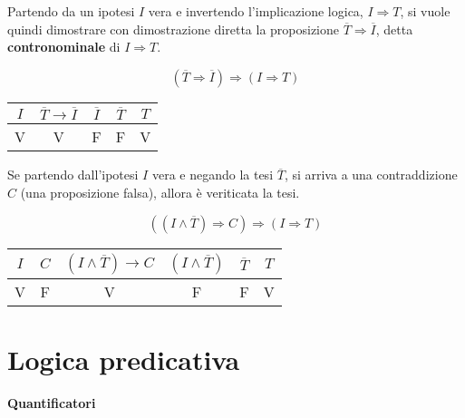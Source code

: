 \begin{definition} Partendo da un ipotesi $I$ vera e invertendo l'implicazione logica, $I \Rightarrow T$, si vuole quindi dimostrare con dimostrazione diretta la proposizione $\overline{T} \Rightarrow \overline{I}$, detta \textbf{contronominale} di $I \Rightarrow T$.
\end{definition}
\begin{equation}
    ( \overline{T} \Rightarrow \overline{I} ) \Rightarrow ( I \Rightarrow T )
\end{equation}
\begin{center}
\begin{tabular}{|c|c||c|c|c|}
  \hline
  $I$ & $\overline{T} \rightarrow \overline{I}$ & $\overline{I}$ & $\overline{T}$ & $T$ \\
  \hline
  V & V & F & F & V \\
  \hline
\end{tabular}
\end{center}

\begin{definition} Se partendo dall'ipotesi $I$ vera e negando la tesi $\overline{T}$, si arriva a una contraddizione $C$ (una proposizione falsa), allora è veriticata la tesi.
\end{definition}
\begin{equation}
    \left( ( I \land \overline{T} ) \Rightarrow C \right) \Rightarrow ( I \Rightarrow T )
\end{equation}
\begin{center}
\begin{tabular}{|c|c|c||c|c|c|}
  \hline
  $I$ & $C$ & $(I \land \overline{T}) \rightarrow C$ & $(I \land \overline{T})$ & $\overline{T}$ & $T$ \\
  \hline
  V & F & V & F & F & V \\
  \hline
\end{tabular}
\end{center}

{\color{red}
\section{Logica predicativa}
\paragraph{Quantificatori}
}

